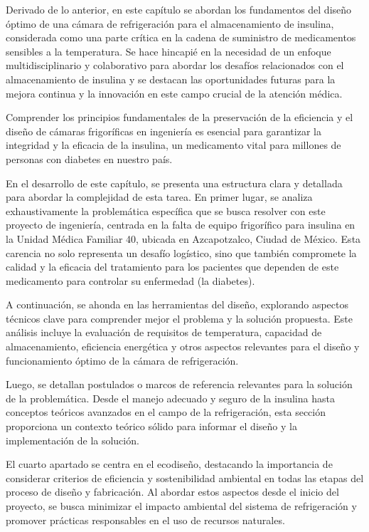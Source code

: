 Derivado de lo anterior, en este capítulo se abordan los fundamentos del diseño óptimo de una cámara de refrigeración para el almacenamiento de insulina, considerada como una parte crítica en la cadena de suministro de medicamentos sensibles a la temperatura. Se hace hincapié en la necesidad de un enfoque multidisciplinario y colaborativo para abordar los desafíos relacionados con el almacenamiento de insulina y se destacan las oportunidades futuras para la mejora continua y la innovación en este campo crucial de la atención médica.

Comprender los principios fundamentales de la preservación de la eficiencia y el diseño de cámaras frigoríficas en ingeniería es esencial para garantizar la integridad y la eficacia de la insulina, un medicamento vital para millones de personas con diabetes en nuestro país.

En el desarrollo de este capítulo, se presenta una estructura clara y detallada para abordar la complejidad de esta tarea. En primer lugar, se analiza exhaustivamente la problemática específica que se busca resolver con este proyecto de ingeniería, centrada en la falta de equipo frigorífico para insulina en la Unidad Médica Familiar 40, ubicada en Azcapotzalco, Ciudad de México. Esta carencia no solo representa un desafío logístico, sino que también compromete la calidad y la eficacia del tratamiento para los pacientes que dependen de este medicamento para controlar su enfermedad (la diabetes).

A continuación, se ahonda en las herramientas del diseño, explorando aspectos técnicos clave para comprender mejor el problema y la solución propuesta. Este análisis incluye la evaluación de requisitos de temperatura, capacidad de almacenamiento, eficiencia energética y otros aspectos relevantes para el diseño y funcionamiento óptimo de la cámara de refrigeración.

Luego, se detallan postulados o marcos de referencia relevantes para la solución de la problemática. Desde el manejo adecuado y seguro de la insulina hasta conceptos teóricos avanzados en el campo de la refrigeración, esta sección proporciona un contexto teórico sólido para informar el diseño y la implementación de la solución.

El cuarto apartado se centra en el ecodiseño, destacando la importancia de considerar criterios de eficiencia y sostenibilidad ambiental en todas las etapas del proceso de diseño y fabricación. Al abordar estos aspectos desde el inicio del proyecto, se busca minimizar el impacto ambiental del sistema de refrigeración y promover prácticas responsables en el uso de recursos naturales.

